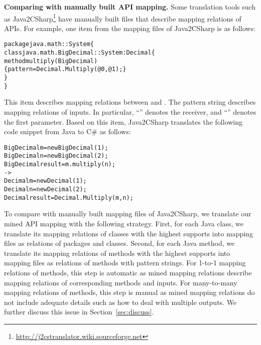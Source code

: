 \textbf{Comparing with manually built API mapping.} Some translation
tools such as
Java2CSharp\footnote{\url{http://j2cstranslator.wiki.sourceforge.net}}
have manually built files that describe mapping relations of APIs.
For example, one item from the mapping files of Java2CSharp is as
follows:

\begin{CodeOut}\vspace*{-2ex}
\begin{alltt}
package java.math :: System \{
  class java.math.BigDecimal :: System:Decimal \{
    method multiply(BigDecimal)
       \{ pattern =  Decimal.Multiply(@0, @1); \}
  \}
\}
\end{alltt}
\end{CodeOut}\vspace*{-2ex}

This item describes mapping relations between  and . The
pattern string describes mapping relations of inputs. In particular,
``'' denotes the receiver, and ``'' denotes
the first parameter. Based on this item, Java2CSharp translates the
following code snippet from Java to C\# as follows:

\begin{CodeOut}\vspace*{-2ex}
\begin{alltt}
  BigDecimal m = new BigDecimal(1);
  BigDecimal n = new BigDecimal(2);
  BigDecimal result = m.multiply(n);
  ->
  Decimal m = new Decimal(1);
  Decimal n = new Decimal(2);
  Decimal result = Decimal.Multiply(m,n);
\end{alltt}
\end{CodeOut}\vspace*{-2ex}

To compare with manually built mapping files of Java2CSharp, we
translate our mined API mapping with the following strategy. First,
for each Java class, we translate its mapping relations of classes
with the highest supports into mapping files as relations of
packages and classes. Second, for each Java method, we translate its
mapping relations of methods with the highest supports into mapping
files as relations of methods with pattern strings. For 1-to-1
mapping relations of methods, this step is automatic as mined
mapping relations describe mapping relations of corresponding
methods and inputs. For many-to-many mapping relations of methods,
this step is manual as mined mapping relations do not include
adequate details such as how to deal with multiple outputs. We
further discuss this issue in Section~\ref{sec:discuss}.

